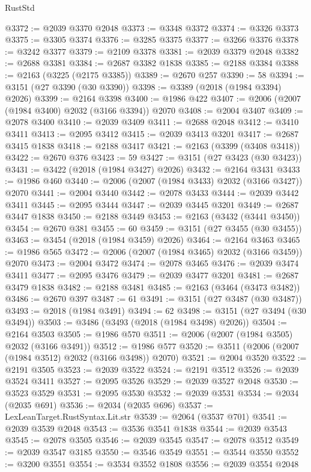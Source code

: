 \begin{lexlean}{RustStd}
\begin{coremodule}
@3372 := @2039 @3370 @2048
@3373 := @3348 @3372
@3374 := @3326 @3373
@3375 := @3305 @3374
@3376 := @3285 @3375
@3377 := @3266 @3376
@3378 := @3242 @3377
@3379 := @2109 @3378
@3381 := @2039 @3379 @2048
@3382 := @2688 @3381
@3384 := @2687 @3382 @1838
@3385 := @2188 @3384
@3388 := @2163 (@3225 (@2175 @3385))
@3389 := @2670 @257
@3390 := 58
@3394 := @3151 (@27 @3390 (@30 @3390))
@3398 := @3389 (@2018 (@1984 @3394) @2026)
@3399 := @2164 @3398
@3400 := @1986 @422
@3407 := @2006 (@2007 (@1984 @3400) @2032 (@3166 @3394)) @2070
@3408 := @2004 @3407
@3409 := @2078 @3400
@3410 := @2039 @3409
@3411 := @2688 @2048
@3412 := @3410 @3411
@3413 := @2095 @3412
@3415 := @2039 @3413 @3201
@3417 := @2687 @3415 @1838
@3418 := @2188 @3417
@3421 := @2163 (@3399 (@3408 @3418))
@3422 := @2670 @376
@3423 := 59
@3427 := @3151 (@27 @3423 (@30 @3423))
@3431 := @3422 (@2018 (@1984 @3427) @2026)
@3432 := @2164 @3431
@3433 := @1986 @460
@3440 := @2006 (@2007 (@1984 @3433) @2032 (@3166 @3427)) @2070
@3441 := @2004 @3440
@3442 := @2078 @3433
@3444 := @2039 @3442 @3411
@3445 := @2095 @3444
@3447 := @2039 @3445 @3201
@3449 := @2687 @3447 @1838
@3450 := @2188 @3449
@3453 := @2163 (@3432 (@3441 @3450))
@3454 := @2670 @381
@3455 := 60
@3459 := @3151 (@27 @3455 (@30 @3455))
@3463 := @3454 (@2018 (@1984 @3459) @2026)
@3464 := @2164 @3463
@3465 := @1986 @565
@3472 := @2006 (@2007 (@1984 @3465) @2032 (@3166 @3459)) @2070
@3473 := @2004 @3472
@3474 := @2078 @3465
@3476 := @2039 @3474 @3411
@3477 := @2095 @3476
@3479 := @2039 @3477 @3201
@3481 := @2687 @3479 @1838
@3482 := @2188 @3481
@3485 := @2163 (@3464 (@3473 @3482))
@3486 := @2670 @397
@3487 := 61
@3491 := @3151 (@27 @3487 (@30 @3487))
@3493 := @2018 (@1984 @3491)
@3494 := 62
@3498 := @3151 (@27 @3494 (@30 @3494))
@3503 := @3486 (@3493 (@2018 (@1984 @3498) @2026))
@3504 := @2164 @3503
@3505 := @1986 @570
@3511 := @2006 (@2007 (@1984 @3505) @2032 (@3166 @3491))
@3512 := @1986 @577
@3520 := @3511 (@2006 (@2007 (@1984 @3512) @2032 (@3166 @3498)) @2070)
@3521 := @2004 @3520
@3522 := @2191 @3505
@3523 := @2039 @3522
@3524 := @2191 @3512
@3526 := @2039 @3524 @3411
@3527 := @2095 @3526
@3529 := @2039 @3527 @2048
@3530 := @3523 @3529
@3531 := @2095 @3530
@3532 := @2039 @3531
@3534 := @2034 (@2035 @691)
@3536 := @2034 (@2035 @696)
@3537 := LexLeanTarget.RustSyntax.Lit.str
@3539 := @2064 (@3537 @701)
@3541 := @2039 @3539 @2048
@3543 := @3536 @3541 @1838
@3544 := @2039 @3543
@3545 := @2078 @3505
@3546 := @2039 @3545
@3547 := @2078 @3512
@3549 := @2039 @3547 @3185
@3550 := @3546 @3549
@3551 := @3544 @3550
@3552 := @3200 @3551
@3554 := @3534 @3552 @1808
@3556 := @2039 @3554 @2048

\end{coremodule}
\end{lexlean}

